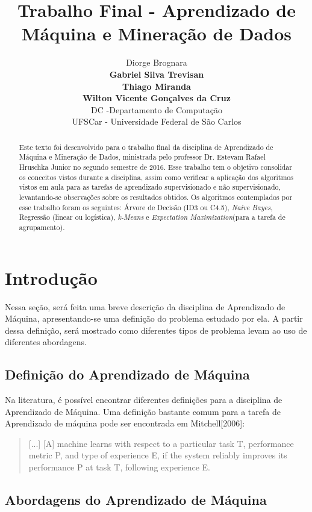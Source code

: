 \documentclass{article}
\title{Trabalho Final - Aprendizado de Máquina e Mineração de Dados}
\author{Diorge Brognara \\ {\bf Gabriel Silva Trevisan}  \\ {\bf Thiago Miranda} \\ {\bf Wilton Vicente Gonçalves da Cruz}\\
DC -Departamento de Computação \\
UFSCar - Universidade Federal de São Carlos\\
}
\begin{document}
\maketitle

\begin{abstract}
	Este texto foi desenvolvido para o trabalho final da disciplina de Aprendizado de Máquina e Mineração de Dados, ministrada pelo professor Dr. Estevam Rafael Hruschka Junior no segundo semestre de 2016. Esse trabalho tem o objetivo consolidar os conceitos vistos durante a disciplina, assim como verificar a aplicação dos algoritmos vistos em aula para as tarefas de aprendizado supervisionado e não supervisionado, levantando-se observações sobre os resultados obtidos. Os algoritmos contemplados por esse trabalho foram os seguintes: Árvore de Decisão (ID3 ou C4.5), {\it Naive Bayes}, Regressão (linear ou logística), {\it k-Means} e {\it Expectation Maximization}(para a tarefa de agrupamento).
\end{abstract}

\section{Introdução}

Nessa seção, será feita uma breve descrição da disciplina de Aprendizado de Máquina, apresentando-se uma definição do problema estudado por ela. A partir dessa definição, será mostrado como diferentes tipos de problema levam ao uso de diferentes abordagens.

\subsection{Definição do Aprendizado de Máquina}

Na literatura, é possível encontrar diferentes definições para a disciplina de Aprendizado de Máquina. Uma definição bastante comum para a tarefa de Aprendizado de máquina pode ser encontrada em Mitchell[2006]:
\begin{quote}
[...] [A] machine learns with respect to a particular task T, performance metric P, and type of experience E, if the system reliably improves its performance P at task T, following experience E. \cite{mitchell06}
\end{quote}


\subsection{Abordagens do Aprendizado de Máquina}
\end{document}
